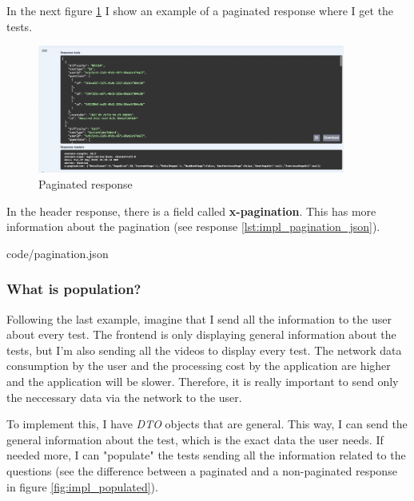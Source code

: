             In the next figure \ref{fig:impl_pagination} I show an example of a paginated response where I get the tests. 

            \begin{figure}[H]
                \centering
                    \includegraphics[width=0.9\textwidth]{assets/pagination.png}
                \caption{Paginated response}
                \label{fig:impl_pagination}
            \end{figure}

            In the header response, there is a field called \textbf{x-pagination}. This has
            more information about the pagination (see response \ref{lst:impl_pagination_json}).

            
            {code/pagination.json}
        
        \subsubsection{What is population?}
            Following the last example, imagine that I send all the information to the user about every test. 
            The frontend is only displaying general information about the tests, but I'm also sending all the videos to display every test. 
            The network data consumption by the user and the processing cost by the application are higher and the application will be slower.
            Therefore, it is really important to send only the neccessary data via the network to the user.
            
            To implement this, I have \textit{DTO} objects that are general. This way, I can send the general information about the test, which is the exact data the user needs. If needed more, I can "populate" the tests 
            sending all the information related to the questions (see the difference between a paginated and a non-paginated response in figure \ref{fig:impl_populated}).

